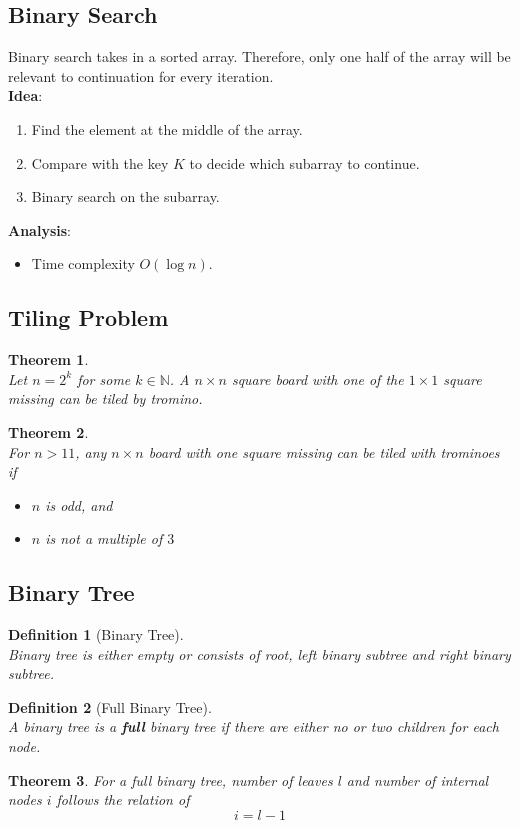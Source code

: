 \documentclass[12pt]{article}
\newtheorem{definition}{Definition}[section]
\newtheorem{theorem}{Theorem}[section]
\theoremstyle{definition}
\begin{document}
\subsection{Binary Search}
Binary search takes in a sorted array. Therefore, only one half of the array will be relevant to continuation for every iteration.\\
\textbf{Idea}:
\begin{enumerate}
  \item Find the element at the middle of the array.
  \item Compare with the key $K$ to decide which subarray to continue.
  \item Binary search on the subarray.
\end{enumerate}
\textbf{Analysis}:
\begin{itemize}
  \item Time complexity $O(\log n)$.
\end{itemize}
\subsection{Tiling Problem}
\begin{theorem}
\hfill\\\normalfont Let $n=2^k$ for some $k\in \mathbb{N}$. A $n\times n$ square board with one of the $1\times 1$ square missing can be tiled by tromino.
\end{theorem}
\begin{theorem}
\hfill\\\normalfont For $n>11$, any $n\times n$ board with one square missing can be tiled with trominoes if
\begin{itemize}
  \item $n$ is odd, and
  \item $n$ is not a multiple of $3$
\end{itemize}
\end{theorem}
\subsection{Binary Tree}
\begin{definition}[Binary Tree]
\hfill\\\normalfont Binary tree is either empty or consists of root, left binary subtree and right binary subtree.
\end{definition}
\begin{definition}[Full Binary Tree]
\hfill\\\normalfont A binary tree is a \textbf{full} binary tree if there are either no or two children for each node.
\end{definition}
\begin{theorem}
For a full binary tree, number of leaves $l$ and number of internal nodes $i$ follows the relation of
\[
i=l-1
\]
\end{theorem}
\end{document}
